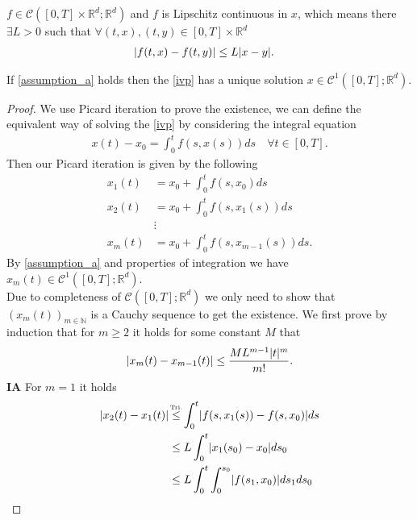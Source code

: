 \begin{assumption}\label{assumption_a}
  $f \in  \mathcal{C}([0,T] \times  \mathbb{R}^{d} ; \mathbb{R}^{d}  )$  and 
  $f$ is Lipschitz continuous in $x$, which means there $\exists L >0$ such that 
    $\forall (t,x),(t,y) \in  [0,T] \times \mathbb{R}^{d}$
  \begin{align*}
    &\lvert f(t,x) - f(t,y)\rvert \le  L \lvert x-y\rvert
  .\end{align*}
\end{assumption}
\begin{theorem}\label{existence_uniqueness}
  If \autoref{assumption_a} holds then the \autoref{ivp} has a unique solution $x \in  \mathcal{C}^{1}([0,T];\mathbb{R}^{d} ) $.
\end{theorem}
\begin{proof}
 We use Picard iteration to prove the existence, we can define the equivalent way of solving the \autoref{ivp} by considering the integral equation
 \begin{align*}
   x(t) - x_{0} = \int_0^{t} f(s,x(s)) ds \quad \forall t \in  [0,T]
 .\end{align*}
 Then our Picard iteration is given by the following 
 \begin{align*}
   x_1(t) &= x_{0} + \int_0^{t} f(s,x_{0})  ds \\
   x_2(t) &= x_{0} + \int_0^{t} f(s,x_{1}(s))  ds \\
          &\vdots \\
   x_m(t) &= x_{0} + \int_0^{t} f(s,x_{m-1}(s))  ds
 .\end{align*}
 By \autoref{assumption_a} and properties of integration we have $x_m(t) \in  \mathcal{C}^{1}([0,T];\mathbb{R}^{d} ) $.\\[1ex]
 Due to completeness of $\mathcal{C}([0,T];\mathbb{R}^{d} )$ we only need to show that $(x_m(t))_{m \in  \mathbb{N}}$ is a Cauchy sequence 
 to get the existence. We first prove by induction that for $m\ge 2$ it holds for some constant $M$ that
 \begin{align*}
   \lvert x_m(t) - x_{m-1}(t)\rvert \le \frac{ML^{m-1}\lvert t\rvert^{m}  }{m!}
 .\end{align*}
 \textbf{IA} For $m=1$ it holds 
 \begin{align*}
   \abs{x_2(t) - x_{1}(t)} &\myS{Tri.}{\le } \int_0^{t}  \abs{f(s,x_{1}(s))-f(s,x_{0})}ds\\
                           &\le L \int_0^{t} \abs{x_{1}(s_{0})-x_{0}}  ds_{0}\\
                           &\le L \int_0^{t} \int_0^{s_{0}}   \abs{f(s_{1},x_{0})}ds_{1}ds_{0}\\

\end{align*}
\end{proof}
